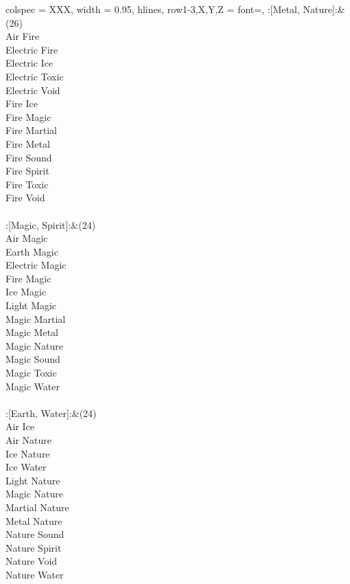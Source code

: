 \begin{longtblr}[
	caption = {2v2 Defending Resisted},
	label = {2v2-Defending-Resisted},
]{
	colspec = {XXX}, width = 0.95\linewidth,
	hlines,
	row{1-3,X,Y,Z} = {font=\bfseries},
}
	:[Metal, Nature]:&{(26)\\
	Air Fire \\
	Electric Fire \\
	Electric Ice \\
	Electric Toxic \\
	Electric Void \\
	Fire Ice \\
	Fire Magic \\
	Fire Martial \\
	Fire Metal \\
	Fire Sound \\
	Fire Spirit \\
	Fire Toxic \\
	Fire Void \\
	}\\

	:[Magic, Spirit]:&{(24)\\
	Air Magic \\
	Earth Magic \\
	Electric Magic \\
	Fire Magic \\
	Ice Magic \\
	Light Magic \\
	Magic Martial \\
	Magic Metal \\
	Magic Nature \\
	Magic Sound \\
	Magic Toxic \\
	Magic Water \\
	}\\

	:[Earth, Water]:&{(24)\\
	Air Ice \\
	Air Nature \\
	Ice Nature \\
	Ice Water \\
	Light Nature \\
	Magic Nature \\
	Martial Nature \\
	Metal Nature \\
	Nature Sound \\
	Nature Spirit \\
	Nature Void \\
	Nature Water \\
	}\\


\end{longtblr}
